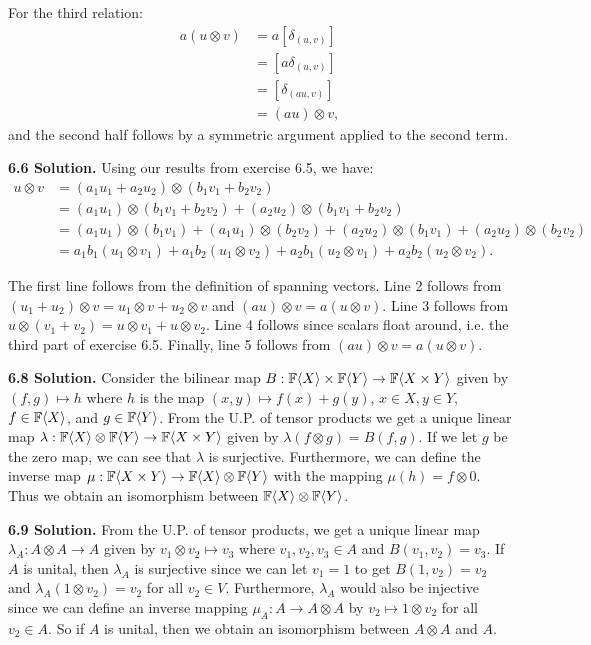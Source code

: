 For the third relation:
\begin{align*}
    a(u \otimes v) &= a[\delta_{(u, v)}] \\
                   &= [a\delta_{(u, v)}] \\
                   &= [\delta_{(au, v)}] \\
                   &= (au) \otimes v,
\end{align*}
and the second half follows by a symmetric argument applied to the second term.

\textbf{6.6 Solution.} Using our results from exercise 6.5, we have:
\begin{align*}
    u \otimes v &= (a_1u_1 + a_2u_2) \otimes (b_1v_1 + b_2v_2) \\
        &= (a_1u_1) \otimes (b_1v_1 + b_2v_2) + (a_2u_2) \otimes (b_1v_1 + b_2v_2) \\
        &= (a_1u_1) \otimes (b_1v_1) + (a_1u_1) \otimes (b_2v_2) + (a_2u_2) \otimes (b_1v_1) + (a_2u_2) \otimes (b_2v_2) \\
        &= a_1b_1(u_1 \otimes v_1) + a_1b_2(u_1 \otimes v_2) + a_2b_1(u_2 \otimes v_1) + a_2b_2(u_2 \otimes v_2).
\end{align*}

The first line follows from the definition of spanning vectors. Line 2 follows from $(u_1 + u_2) \otimes v = u_1 \otimes v + u_2 \otimes v$ and $(au) \otimes v = a(u \otimes v)$. Line 3 follows from $u \otimes (v_1 + v_2) = u \otimes v_1 + u \otimes v_2$. Line 4 follows since scalars float around, i.e. the third part of exercise 6.5. Finally, line 5 follows from $(au) \otimes v = a(u \otimes v)$.


\textbf{6.8 Solution.} Consider the bilinear map $B: \mathbb{F}\langle X \rangle \times \mathbb{F}\langle Y \rangle \to \mathbb{F}\langle X \times Y \rangle$ given by $(f, g) \mapsto h$ where $h$ is the map $(x, y) \mapsto f(x) + g(y)$, $x \in X, y \in Y$, $f \in \mathbb{F}\langle X \rangle$, and $g \in \mathbb{F}\langle Y \rangle$. From the U.P. of tensor products we get a unique linear map $\lambda: \mathbb{F}\langle X \rangle \otimes \mathbb{F}\langle Y \rangle \to \mathbb{F}\langle X \times Y \rangle$ given by $\lambda(f \otimes g) = B(f, g)$. If we let $g$ be the zero map, we can see that $\lambda$ is surjective. Furthermore, we can define the inverse map $\mu: \mathbb{F}\langle X \times Y \rangle \to \mathbb{F}\langle X \rangle \otimes \mathbb{F}\langle Y \rangle$ with the mapping $\mu(h) = f \otimes 0$. Thus we obtain an isomorphism between $\mathbb{F}\langle X \rangle \otimes \mathbb{F}\langle Y \rangle$.

\textbf{6.9 Solution.} From the U.P. of tensor products, we get a unique linear map $\lambda_A: A \otimes A \to A$ given by $v_1 \otimes v_2 \mapsto v_3$ where $v_1, v_2, v_3 \in A$ and $B(v_1, v_2) = v_3$. If $A$ is unital, then $\lambda_A$ is surjective since we can let $v_1 = 1$ to get $B(1, v_2) = v_2$ and $\lambda_A(1 \otimes v_2) = v_2$ for all $v_2 \in V$. Furthermore, $\lambda_A$ would also be injective since we can define an inverse mapping $\mu_A: A \to A \otimes A$ by $v_2 \mapsto 1 \otimes v_2$ for all $v_2 \in A$. So if $A$ is unital, then we obtain an isomorphism between $A \otimes A$ and $A$.

